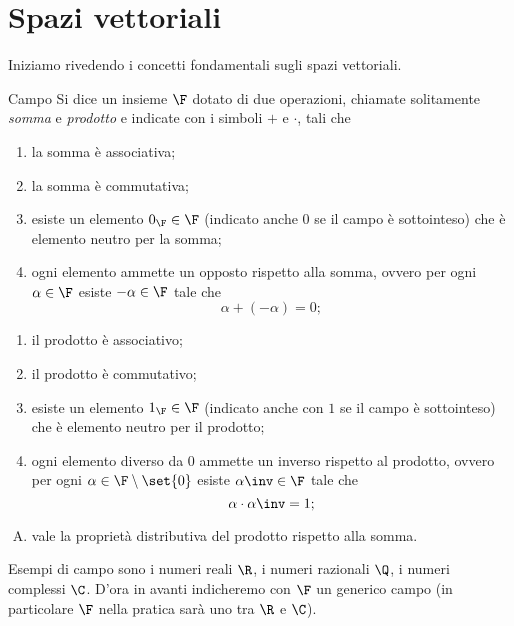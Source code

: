 \section{Spazi vettoriali}

Iniziamo rivedendo i concetti fondamentali sugli spazi vettoriali.

\begin{definition}
    {Campo}{} Si dice  un insieme $\F$ dotato di due operazioni, chiamate solitamente \emph{somma} e \emph{prodotto} e indicate con i simboli $+$ e $\cdot$, tali che \begin{enumerate}[(S1)]
        \item la somma è associativa;
        \item la somma è commutativa;
        \item esiste un elemento $0_{\F} \in \F$ (indicato anche $0$ se il campo è sottointeso) che è elemento neutro per la somma;
        \item ogni elemento ammette un opposto rispetto alla somma, ovvero per ogni $\alpha \in \F$ esiste $-\alpha \in \F$ tale che \[
            \alpha + (-\alpha) = 0;
        \]   
    \end{enumerate}
    \begin{enumerate}[(P1)]
        \item il prodotto è associativo;
        \item il prodotto è commutativo;
        \item esiste un elemento $1_{\F} \in \F$ (indicato anche con $1$ se il campo è sottointeso) che è elemento neutro per il prodotto;
        \item ogni elemento diverso da $0$ ammette un inverso rispetto al prodotto, ovvero per ogni $\alpha \in \F \setminus \set{0}$ esiste $\alpha\inv \in \F$ tale che \[
            \alpha \cdot \alpha\inv = 1;
        \]  
    \end{enumerate}
    \begin{enumerate}[(D)]
        \item vale la proprietà distributiva del prodotto rispetto alla somma.
    \end{enumerate}
\end{definition}

Esempi di campo sono i numeri reali $\R$, i numeri razionali $\Q$, i numeri complessi $\C$. D'ora in avanti indicheremo con $\F$ un generico campo (in particolare $\F$ nella pratica sarà uno tra $\R$ e $\C$).

